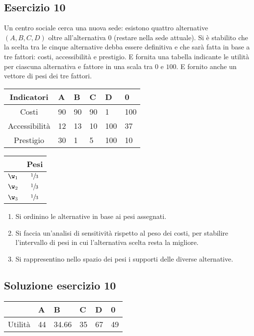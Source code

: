 \documentclass[\main/main.tex]{subfiles}
\begin{document}
\subsection{Esercizio 10}
Un centro sociale cerca una nuova sede: esistono quattro alternative $(A, B, C, D)$ oltre all'alternativa $0$ (restare nella sede attuale). Si è stabilito che la scelta tra le cinque alternative debba essere definitiva e che sarà fatta in base a tre fattori: costi, accessibilità e prestigio. E fornita una tabella indicante le utilità per ciascuna alternativa e fattore in una scala tra $0$ e $100$. E fornito anche un vettore di pesi dei tre fattori.

\begin{table}
  \begin{tabular}{c|LLLLL}
    Indicatori    & A  & B  & C  & D   & 0   \\
    \hline
    Costi         & 90 & 90 & 90 & 1   & 100 \\
    Accessibilità & 12 & 13 & 10 & 100 & 37  \\
    Prestigio     & 30 & 1  & 5  & 100 & 10  \\
  \end{tabular}
  \begin{tabular}{c|c}
           & Pesi           \\
    \hline
    $\w_1$ & $\sfrac{1}{3}$ \\
    $\w_2$ & $\sfrac{1}{3}$ \\
    $\w_3$ & $\sfrac{1}{3}$ \\
  \end{tabular}
\end{table}

\begin{enumerate}
  \item Si ordinino le alternative in base ai pesi assegnati.
  \item Si faccia un'analisi di sensitività rispetto al peso dei costi, per stabilire l'intervallo di pesi in cui l'alternativa scelta resta la migliore.
  \item Si rappresentino nello spazio dei pesi i supporti delle diverse alternative.
\end{enumerate}

\subsection{Soluzione esercizio 10}
\begin{table}
  \begin{tabular}{c|LLLLL}
            & A  & B     & C  & D  & 0  \\
    \hline
    Utilità & 44 & 34.66 & 35 & 67 & 49
  \end{tabular}
\end{table}
\end{document}
